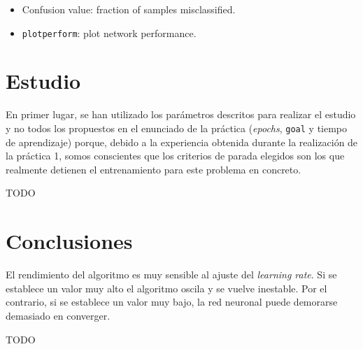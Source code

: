 \documentclass[a4paper,12pt,titlepage]{article}
\begin{document}
\begin{itemize}[noitemsep]
	\item Confusion value: fraction of samples misclassified.
	\item \lstinline|plotperform|: plot network performance. \citep{matlab:plotperform}
\end{itemize}

\section{Estudio}

En primer lugar, se han utilizado los parámetros descritos para realizar el estudio y no todos los propuestos en el enunciado de la práctica (\textit{epochs}, \lstinline|goal| y tiempo de aprendizaje) porque, debido a la experiencia obtenida durante la realización de la práctica 1, somos conscientes que los criterios de parada elegidos son los que realmente detienen el entrenamiento para este problema en concreto.





TODO

\section{Conclusiones}

El rendimiento del algoritmo es muy sensible al ajuste del \textit{learning rate}. Si se establece un valor muy alto el algoritmo oscila y se vuelve inestable. Por el contrario, si se establece un valor muy bajo, la red neuronal puede demorarse demasiado en converger. 

TODO



\end{document}
